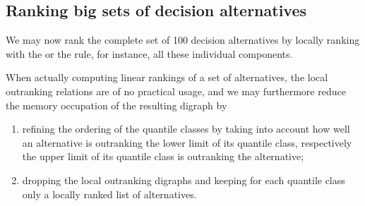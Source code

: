 \documentclass[a4paper,12pt,english]{sphinxhowto}
\begin{document}
\begin{sphinxVerbatim}[commandchars=\\\{\},numbers=left,firstnumber=1,stepnumber=1]
          
               \PYG{p}{[}\PYG{p}{]}\PYG{p}{[}\PYG{p}{]}
                
                  
                  
        
          
          
\end{sphinxVerbatim}


\subsection{Ranking big sets of decision alternatives}
\label{\detokenize{tutorial:ranking-big-sets-of-decision-alternatives}}
We may now rank the complete set of 100 decision alternatives by locally ranking with the  or the  rule, for instance, all these individual components.

\begin{sphinxVerbatim}[commandchars=\\\{\},numbers=left,firstnumber=1,stepnumber=1]
\PYG{g+go}{ [22, 53, 3, 34, 56, 62, 24, 44, 50, 93, 41, 63, 29, 58,}
\PYG{g+go}{  52, 15, 32, 49, 51, 74, 16, 14, 75, 79, 83, 84]}
\end{sphinxVerbatim}

When actually computing linear rankings of a set of alternatives, the local outranking relations are of no practical usage, and we may furthermore reduce the memory occupation of the resulting digraph by
\begin{enumerate}
%
\item {} 
refining the ordering of the quantile classes by taking into account how well an alternative is outranking the lower limit of its quantile class, respectively the upper limit of its quantile class is  outranking the alternative;

\item {} 
dropping the local outranking digraphs and keeping for each quantile class only a locally ranked list of alternatives.

\end{enumerate}
\end{document}
